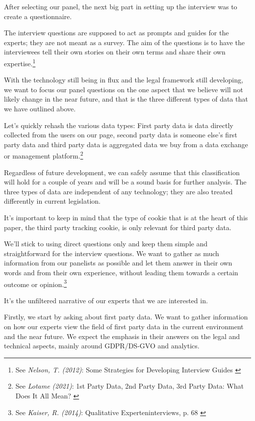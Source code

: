 After selecting our panel, the next big part in setting up the interview was to create a questionnaire.

The interview questions are supposed to act as prompts and guides for the experts; they are not meant as a survey. The aim of the questions is to have the interviewees tell their own stories on their own terms and share their own expertise.\footnote{See \textit{Nelson, T. (2012)}: Some Strategies for Developing Interview Guides \cite{qualiStrategies}}

With the technology still being in flux and the legal framework still developing, we want to focus our panel questions on the one aspect that we believe will not likely change in the near future, and that is the three different types of data that we have outlined above.

Let's quickly rehash the various data types: First party data is data directly collected from the users on our page, second party data is someone else's first party data and third party data is aggregated data we buy from a data exchange or management platform.\footnote{See \textit{Lotame (2021)}: 1st Party Data, 2nd Party Data, 3rd Party Data: What Does It All Mean? \cite{lotameRehash}}

Regardless of future development, we can safely assume that this classification will hold for a couple of years and will be a sound basis for further analysis. The three types of data are independent of any technology; they are also treated differently in current legislation.

It's important to keep in mind that the type of cookie that is at the heart of this paper, the third party tracking cookie, is only relevant for third party data.

We'll stick to using direct questions only and keep them simple and straightforward for the interview questions. We want to gather as much information from our panelists as possible and let them answer in their own words and from their own experience, without leading them towards a certain outcome or opinion.\footnote{See \textit{Kaiser, R. (2014)}: Qualitative Experteninterviews, p. 68 \cite{expertInterviews}} 

It's the unfiltered narrative of our experts that we are interested in.

Firstly, we start by asking about first party data. We want to gather information on how our experts view the field of first party data in the current environment and the near future. We expect the emphasis in their answers on the legal and technical aspects, mainly around GDPR/DS-GVO and analytics.

